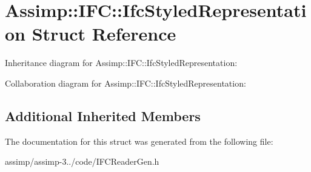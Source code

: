 \hypertarget{struct_assimp_1_1_i_f_c_1_1_ifc_styled_representation}{\section{Assimp\+:\+:I\+F\+C\+:\+:Ifc\+Styled\+Representation Struct Reference}
\label{struct_assimp_1_1_i_f_c_1_1_ifc_styled_representation}
}


Inheritance diagram for Assimp\+:\+:I\+F\+C\+:\+:Ifc\+Styled\+Representation\+:


Collaboration diagram for Assimp\+:\+:I\+F\+C\+:\+:Ifc\+Styled\+Representation\+:
\subsection*{Additional Inherited Members}


The documentation for this struct was generated from the following file\+:\begin{DoxyCompactItemize}
\item 
assimp/assimp-\/3../code/I\+F\+C\+Reader\+Gen.\+h\end{DoxyCompactItemize}
